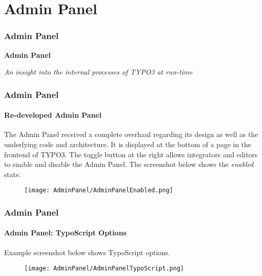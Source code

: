 %

\section{Admin Panel}
\begin{frame}[fragile]
	\frametitle{Admin Panel}

	\begin{center}\huge{\color{typo3darkgrey}\textbf{Admin Panel}}\end{center}
	\begin{center}\large{\textit{An insight into the internal processes of TYPO3 at run-time}}\end{center}

\end{frame}


\begin{frame}[fragile]
	\frametitle{Admin Panel}
	\framesubtitle{Re-developed Admin Panel}

    The Admin Panel received a complete overhaul regarding its design as well as
    the underlying code and architecture.
	\newline\newline
	It is displayed at the bottom of a page in the frontend of TYPO3. The toggle
	button at the right allows integrators and editors to enable and disable the
	Admin Panel. The screenshot below shows the \textit{enabled} state.
	\vspace{0.8cm}
	\begin{figure}
		\texttt{[image: AdminPanel/AdminPanelEnabled.png]}
	\end{figure}

\end{frame}


\begin{frame}[fragile]
	\frametitle{Admin Panel}
	\framesubtitle{Admin Panel: TypoScript Options}

	Example screenshot below shows TypoScript options.

	\begin{figure}
		\texttt{[image: AdminPanel/AdminPanelTypoScript.png]}
	\end{figure}

\end{frame}

